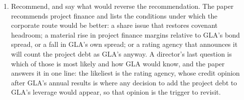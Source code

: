 \begin{enumerate}
\item Recommend, and say what would reverse the recommendation. The paper recommends project finance and lists the conditions under which the corporate route would be better: a share issue that restores covenant headroom; a material rise in project finance margins relative to GLA's bond spread, or a fall in GLA's own spread; or a rating agency that announces it will count the project debt as GLA's anyway. A director's last question is which of those is most likely and how GLA would know, and the paper answers it in one line: the likeliest is the rating agency, whose credit opinion after GLA's annual results is where any decision to add the project debt to GLA's leverage would appear, so that opinion is the trigger to revisit.
\end{enumerate}

